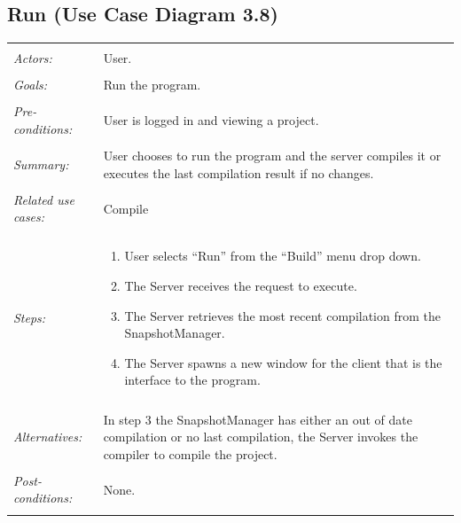 \documentclass[11pt]{report}
\begin{document}
\subsection{Run (Use Case Diagram 3.8)}
\begin{tabular}{ p{2cm} p{12cm} }
     \hline
     \\
     \textit{Actors:} & User. \\ 
     \\
     \textit{Goals:} & Run the program. \\
     \\
     \textit{Pre-conditions:} & User is logged in and viewing a project. \\
     \\
     \textit{Summary:} & User chooses to run the program and the server compiles it or executes the last compilation result if no changes. \\
     \\
     \textit{Related use cases:} & Compile \\ 
     \\
     \textit{Steps:} & \begin{enumerate}
        \item User selects ``Run'' from the ``Build'' menu drop down.
        \item The Server receives the request to execute.
        \item The Server retrieves the most recent compilation from the SnapshotManager.
        \item The Server spawns a new window for the client that is the interface to the program.
     \end{enumerate} \\
     \\
     \textit{Alternatives:} & In step 3 the SnapshotManager has either an out of date compilation or no last compilation, the Server invokes the compiler to compile the project. \\
     \\
     \textit{Post-conditions:} & None. \\
     \\
    \hline
\end{tabular}
\end{document}
